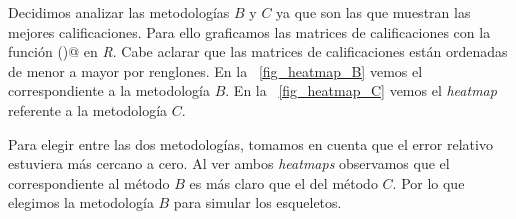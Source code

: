 Decidimos analizar las metodologías $B$ y $C$ ya que son las que muestran las mejores calificaciones. Para ello graficamos las matrices de calificaciones con la función \verb@heatmap()@ en \textit{R}. Cabe aclarar que las matrices de calificaciones están ordenadas de menor a mayor por renglones. En la \figurename{~\ref{fig_heatmap_B}} vemos el correspondiente a la metodología $B$. En la \figurename{~\ref{fig_heatmap_C}} vemos el \textit{heatmap} referente a la metodología $C$.


%
%
%


Para elegir entre las dos metodologías, tomamos en cuenta que el error relativo estuviera más cercano a cero. Al ver ambos \textit{heatmaps} observamos que el correspondiente al método $B$ es más claro que el del método $C$. Por lo que elegimos la metodología $B$ para simular los esqueletos. %
                                                                                                                                                                                                                                                                                                                                                                                                                                                                                  
